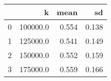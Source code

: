 \begin{tabular}{lrrr}
\toprule
{} &         k &   mean &     sd \\
\midrule
0 &  100000.0 &  0.554 &  0.138 \\
1 &  125000.0 &  0.541 &  0.149 \\
2 &  150000.0 &  0.552 &  0.159 \\
3 &  175000.0 &  0.559 &  0.166 \\
\bottomrule
\end{tabular}

